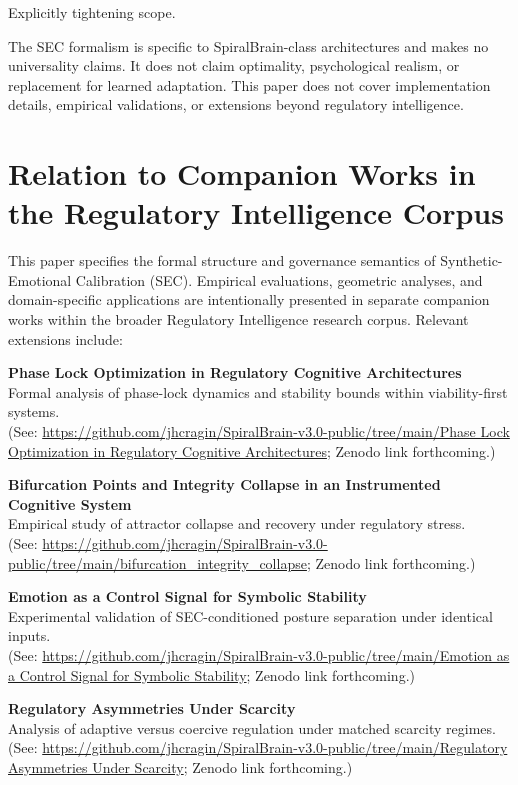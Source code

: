\documentclass[12pt,a4paper]{article}
\begin{document}
Explicitly tightening scope.

The SEC formalism is specific to SpiralBrain-class architectures and makes no universality claims. It does not claim optimality, psychological realism, or replacement for learned adaptation. This paper does not cover implementation details, empirical validations, or extensions beyond regulatory intelligence.

\section{Relation to Companion Works in the Regulatory Intelligence Corpus}

This paper specifies the formal structure and governance semantics of Synthetic-Emotional Calibration (SEC). Empirical evaluations, geometric analyses, and domain-specific applications are intentionally presented in separate companion works within the broader Regulatory Intelligence research corpus. Relevant extensions include:

\textbf{Phase Lock Optimization in Regulatory Cognitive Architectures} \\
Formal analysis of phase-lock dynamics and stability bounds within viability-first systems. \\
(See: \url{https://github.com/jhcragin/SpiralBrain-v3.0-public/tree/main/Phase Lock Optimization in Regulatory Cognitive Architectures}; Zenodo link forthcoming.)

\textbf{Bifurcation Points and Integrity Collapse in an Instrumented Cognitive System} \\
Empirical study of attractor collapse and recovery under regulatory stress. \\
(See: \url{https://github.com/jhcragin/SpiralBrain-v3.0-public/tree/main/bifurcation_integrity_collapse}; Zenodo link forthcoming.)

\textbf{Emotion as a Control Signal for Symbolic Stability} \\
Experimental validation of SEC-conditioned posture separation under identical inputs. \\
(See: \url{https://github.com/jhcragin/SpiralBrain-v3.0-public/tree/main/Emotion as a Control Signal for Symbolic Stability}; Zenodo link forthcoming.)

\textbf{Regulatory Asymmetries Under Scarcity} \\
Analysis of adaptive versus coercive regulation under matched scarcity regimes. \\
(See: \url{https://github.com/jhcragin/SpiralBrain-v3.0-public/tree/main/Regulatory Asymmetries Under Scarcity}; Zenodo link forthcoming.)
\end{document}
